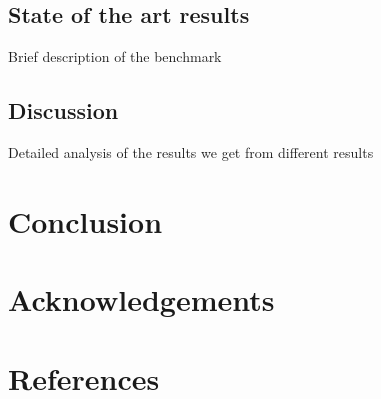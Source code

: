 \documentclass{article} %
\begin{document}
\subsection{State of the art results}
Brief description of the benchmark

\subsection{Discussion}
Detailed analysis of the results we get from different results

\section{Conclusion}

\section{Acknowledgements}

\section{References}



\end{document}

